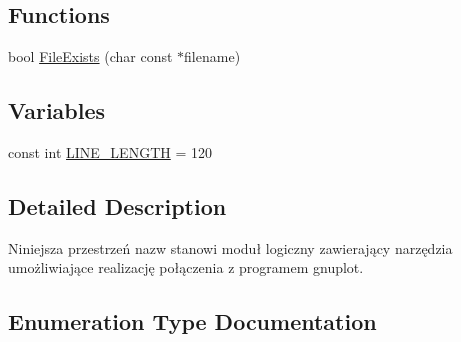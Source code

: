\subsection*{Functions}
\begin{DoxyCompactItemize}
\item 
bool \hyperlink{namespace_pz_g_a64a72627607d0c3f47a61d19744eebef}{File\+Exists} (char const $\ast$filename)
\end{DoxyCompactItemize}
\subsection*{Variables}
\begin{DoxyCompactItemize}
\item 
const int \hyperlink{namespace_pz_g_a6d8d7783183a08d769e3c695cd35587f}{L\+I\+N\+E\+\_\+\+L\+E\+N\+G\+TH} = 120
\end{DoxyCompactItemize}


\subsection{Detailed Description}
Niniejsza przestrzeń nazw stanowi moduł logiczny zawierający narzędzia umożliwiające realizację połączenia z programem {\ttfamily gnuplot}. 

\subsection{Enumeration Type Documentation}
